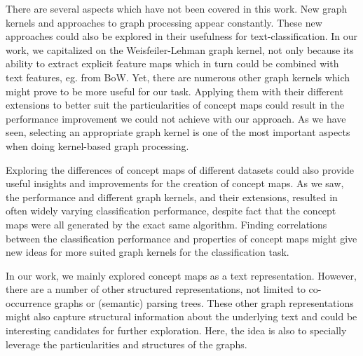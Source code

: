 
There are several aspects which have not been covered in this work.
New graph kernels and approaches to graph processing appear constantly. These new approaches could also be explored in their usefulness for text-classification.
In our work, we capitalized on the Weisfeiler-Lehman graph kernel, not only because its ability to extract explicit feature maps which in turn could be combined with text features, eg. from BoW.
Yet, there are numerous other graph kernels which might prove to be more useful for our task.
Applying them with their different extensions to better suit the particularities of concept maps could result in the performance improvement we could not achieve with our approach.
As we have seen, selecting an appropriate graph kernel is one of the most important aspects when doing kernel-based graph processing.

Exploring the differences of concept maps of different datasets could also provide useful insights and improvements for the creation of concept maps.
As we saw, the performance and different graph kernels, and their extensions, resulted in often widely varying classification performance, despite fact that the concept maps were all generated by the exact same algorithm.
Finding correlations between the classification performance and properties of concept maps might give new ideas for more suited graph kernels for the classification task.

In our work, we mainly explored concept maps as a text representation. However, there are a number of other structured representations, not limited to co-occurrence graphs or (semantic) parsing trees.
These other graph representations might also capture structural information about the underlying text and could be interesting candidates for further exploration.
Here, the idea is also to specially leverage the particularities and structures of the graphs.

